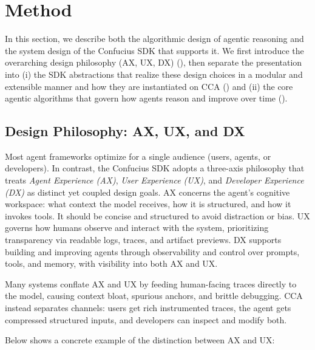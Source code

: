 \section{Method}
\label{sec.method}

In this section, we describe both the algorithmic design of agentic reasoning and the system design of the Confucius SDK that supports it. We first introduce the overarching design philosophy (AX, UX, DX) (), then separate the presentation into (i) the SDK abstractions that realize these design choices in a modular and extensible manner and how they are instantiated on CCA () and (ii) the core agentic algorithms that govern how agents reason and improve over time (). 

\subsection{Design Philosophy: AX, UX, and DX}
\label{sec.3x}


Most agent frameworks optimize for a single audience (users, agents, or developers). In contrast, the Confucius SDK adopts a three-axis philosophy that treats \emph{Agent Experience (AX)}, \emph{User Experience (UX)}, and \emph{Developer Experience (DX)} as distinct yet coupled design goals.
AX concerns the agent’s cognitive workspace: what context the model receives, how it is structured, and how it invokes tools. It should be concise and structured to avoid distraction or bias.
UX governs how humans observe and interact with the system, prioritizing transparency via readable logs, traces, and artifact previews.
DX supports building and improving agents through observability and control over prompts, tools, and memory, with visibility into both AX and UX.

Many systems conflate AX and UX by feeding human-facing traces directly to the model, causing context bloat, spurious anchors, and brittle debugging. CCA instead separates channels: users get rich instrumented traces, the agent gets compressed structured inputs, and developers can inspect and modify both.

Below shows a concrete example of the distinction between AX and UX: \\

